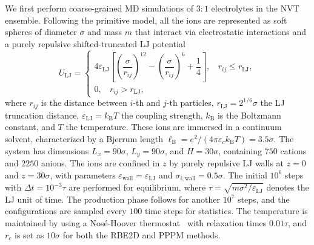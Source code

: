 We first perform coarse-grained MD simulations of $3:1$ electrolytes in the NVT ensemble. 
Following the primitive model, all the ions are represented as soft spheres of diameter $\sigma$ and mass $m$ that interact via  {electrostatic interactions} and a purely repulsive shifted-truncated LJ potential
\begin{equation}
	U_{\text{LJ}}=\begin{cases}
		4\varepsilon_{\text{LJ}}\left[\left(\dfrac{\sigma}{r_{ij}}\right)^{12}-\left(\dfrac{\sigma}{r_{ij}}\right)^6+\dfrac{1}{4}\right],~~~~r_{ij}\leq r_{\text{LJ}},\\
		0,~~~~r_{ij}>r_{\text{LJ}},	
	\end{cases}
\end{equation}
where $r_{ij}$ is the distance between $i$-th and $j$-th particles, $r_{\text{LJ}}=2^{1/6}\sigma$ the LJ truncation distance, $\varepsilon_{\text{LJ}}=k_{\text{B}}T$ the coupling strength, $k_{\text{B}}$ is the Boltzmann constant, and $T$ the temperature. These ions are immersed in a continuum solvent, characterized by a Bjerrum length 
$\ell_{\text{B}}=e^2/(4\pi \varepsilon_c k_{\text{B}}T)=3.5\sigma$. The system has dimensions $L_x=90\sigma$, $L_y=90\sigma$, and $H=30\sigma$, containing $750$ cations and $2250$ anions. The ions are confined in $z$ by purely repulsive LJ walls at $z=0$ and $z=30\sigma$, with parameters $\varepsilon_{\text{wall}}=\varepsilon_{\text{LJ}}$ and $\sigma_{i,\text{wall}}=0.5\sigma$. 
The initial $10^6$ steps with $\Delta t=10^{-3}\tau$ are performed for equilibrium, where $\tau=\sqrt{m\sigma^2/\varepsilon_{\text{LJ}}}$ denotes the LJ unit of time. The production phase follows for another $10^7$ steps, and the configurations are sampled every $100$ time steps for statistics. 
The temperature is maintained by using a Nos\'e-Hoover thermostat~\cite{hoover1985canonical} with relaxation times $0.01\tau$, %
and $r_c$ is set as $10\sigma$ for both the RBE2D and PPPM methods.  

